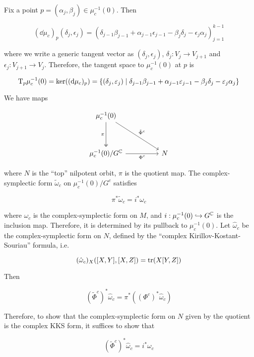 \documentclass{report}
\begin{document}
Fix a point \(p = (\alpha_j, \beta_j) \in \mu_c^{-1}(0)\). Then

\[
(\dd\mu_c)_p(\delta_j, \epsilon_j) = \left(\delta_{j-1}\beta_{j-1} + \alpha_{j-1}\epsilon_{j-1} - \beta_j\delta_j - \epsilon_j\alpha_j\right)_{j=1}^{k-1}
\]

where we write a generic tangent vector as \((\delta_j, \epsilon_j)\), \(\delta_j : V_j \to V_{j+1}\) and \(\epsilon_j : V_{j+1} \to V_j\). Therefore, the tangent space to \(\mu_c^{-1}(0)\) at \(p\) is

\[\mathrm{T}_p\mu_c^{-1}(0) = \ker((\dd\mu_c)_p) = \left\{(\delta_j, \varepsilon_j) \mid \delta_{j-1}\beta_{j-1} + \alpha_{j-1}\varepsilon_{j-1} - \beta_j\delta_j - \varepsilon_j\alpha_j\right\}\]

We have maps

\[\begin{tikzcd}
	{\mu_c^{-1}(0)} \\
	\\
	{\mu_c^{-1}(0) / G^\C} && N
	\arrow["\pi"', two heads, from=1-1, to=3-1]
	\arrow["{\Phi^c}"', from=3-1, to=3-3]
	\arrow["{\tilde\Phi^c}", from=1-1, to=3-3]
\end{tikzcd}\]

where \(N\) is the ``top'' nilpotent orbit, \(\pi\) is the quotient map. The complex-symplectic form \(\tilde\omega_c\) on \(\mu_c^{-1}(0) / G^c\) satisfies

\[\pi^*\tilde\omega_c = i^*\omega_c\]

where \(\omega_c\) is the complex-symplectic form on \(M\), and \(i : \mu_c^{-1}(0) \hookrightarrow G^{\mathbb{C}}\) is the inclusion map. Therefore, it is determined by its pullback to \(\mu_c^{-1}(0)\). Let \(\hat\omega_c\) be the complex-symplectic form on \(N\), defined by the ``complex Kirillov-Kostant-Souriau'' formula, i.e.

\[(\hat\omega_c)_X([X, Y], [X, Z]) = \tr(X[Y, Z])\]

Then

\[(\tilde\Phi^c)^*\hat\omega_c = \pi^*((\Phi^c)^*\hat\omega_c)\]

Therefore, to show that the complex-symplectic form on \(N\) given by the quotient is the complex KKS form, it suffices to show that

\[(\tilde\Phi^c)^*\hat\omega_c = i^*\omega_c\]
\end{document}
